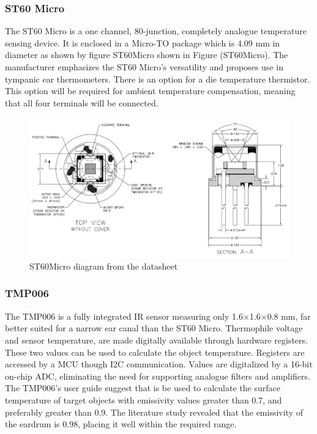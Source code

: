 \subsubsection{ST60 Micro}
The ST60 Micro is a one channel, 80-junction, completely analogue temperature sensing device. It is enclosed in a Micro-TO package which is 4.09 mm in diameter as shown by figure ST60Micro shown in Figure (ST60Micro). The manufacturer emphasizes the ST60 Micro's versatility and proposes use in tympanic ear thermometers. There is an option for a die temperature thermistor. This option will be required for ambient temperature compensation, meaning that all four terminals will be connected.

 \begin{figure}[h]
   \centering
   \includegraphics[scale=1]{figs/ST60Micro.png}
   \caption{ST60Micro diagram from the datasheet}
   \label{fig:ST60Micro}
\end{figure}

\subsubsection{TMP006}
The TMP006 is a fully integrated IR sensor measuring only 1.6$\times$1.6$\times$0.8 mm, far better suited for a narrow ear canal than the ST60 Micro. Thermophile voltage and sensor temperature, are made digitally available through hardware registers. These two values can be used to calculate the object temperature. Registers are accessed by a MCU though I2C communication. Values are digitalized by a 16-bit on-chip ADC, eliminating the need for supporting analogue filters and amplifiers.
The TMP006's user guide suggest that is be used to calculate the surface temperature of target objects with emissivity values greater than 0.7, and preferably greater than 0.9. The literature study revealed that the emissivity of the eardrum is 0.98, placing it well within the required range.

